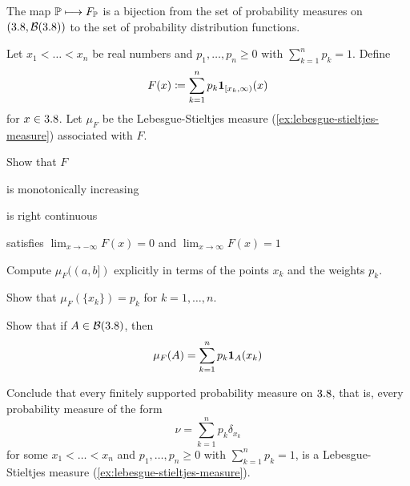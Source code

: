 \begin{theorem}
The map $\mathbb{P} \longmapsto F_{\mathbb{P}}$ is a bijection from the set of probability measures on $(3.8, \allowbreak \mathcal{B}(3.8))$ to the set of probability distribution functions.
\end{theorem}


\begin{exercise}\label{exer:lebesgue-stieltjes-step-function} %
Let $x_1 < \dots < x_n$ be real numbers and $p_1, \ldots, p_n \geq 0$ with $\sum_{k=1}^n p_k = 1$.
Define 
\begin{equation}\label{eq:lebesgue-stieltjes-step-function}
F(x) \coloneq \sum_{k=1}^n p_k \mathbf{1}_{[x_k,\infty)}(x)
\end{equation}
for $x \in 3.8$.
Let $\mu_F$ be the Lebesgue-Stieltjes measure (\autoref{ex:lebesgue-stieltjes-measure}) associated with $F$.
\begin{enumerate}[label={\protect\hyperref[solitem:lebesgue-stieltjes-step-function:\arabic*]{(\alph*)}}]
\item \label{exitem:lebesgue-stieltjes-step-function:1}
Show that $F$
\begin{enumerate}[label={\protect\hyperref[solitem:lebesgue-stieltjes-step-function:\arabic{enumi}.\arabic*]{(\roman*)}}]
\item \label{exitem:lebesgue-stieltjes-step-function:1.1}
is monotonically increasing
\item \label{exitem:lebesgue-stieltjes-step-function:1.2}
is right continuous
\item \label{exitem:lebesgue-stieltjes-step-function:1.3}
satisfies $\lim_{x \to -\infty} F(x) = 0$ and $\lim_{x \to \infty} F(x) = 1$
\end{enumerate}
\item \label{exitem:lebesgue-stieltjes-step-function:2}
Compute $\mu_F((a, b])$ explicitly in terms of the points $x_k$ and the weights $p_k$.
\item \label{exitem:lebesgue-stieltjes-step-function:3}
Show that $\mu_F(\{x_k\}) = p_k$ for $k = 1, \ldots, n$.
\item \label{exitem:lebesgue-stieltjes-step-function:4}
Show that if $A \in \mathcal{B}(3.8)$, then 
\[
\mu_F(A) = \sum_{k=1}^n p_k \mathbf{1}_A(x_k)
\]
\item \label{exitem:lebesgue-stieltjes-step-function:5}
Conclude that every finitely supported probability measure on $3.8$, that is, every probability measure of the form
\[
\nu = \sum_{k=1}^n p_k \delta_{x_k}
\]
for some $x_1 < \dots < x_n$ and $p_1, \ldots, p_n \geq 0$ with $\sum_{k=1}^n p_k = 1$, is a Lebesgue-Stieltjes measure (\autoref{ex:lebesgue-stieltjes-measure}).
\qedhere
\end{enumerate}
\end{exercise}
\pagebreak[3]

